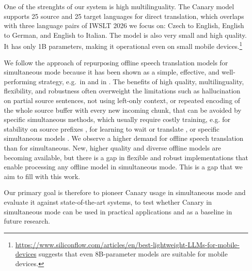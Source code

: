 \documentclass[11pt]{article}
\begin{document}
One of the strenghts of our system is high multilinguality. The Canary model supports 25 source and 25 target languages for direct translation, which overlaps with three language pairs of IWSLT 2026 we focus on: Czech to English, English to German, and English to Italian. The model is also very small and high quality. It has only 1B parameters, making it operational even on small mobile devices.\footnote{\url{https://www.siliconflow.com/articles/en/best-lightweight-LLMs-for-mobile-devices} suggests that even 8B-parameter models are suitable for mobile devices.}


We follow the approach of repurposing offline speech translation models for simultaneous mode because it has been shown as a simple, effective, and well-performing strategy, e.g.\ in \citet{papi-etal-2022-simultaneous} and in \citet{machacek-polak-2025-simultaneous}. The benefits of high quality, multilinguality, flexibility, and robustness often overweight the limitations such as hallucination on partial source sentences, not using left-only context, or repeated encoding of the whole source buffer with every new incoming chunk, that can be avoided by specific simultaneous methods, which usually require costly training, e.g. for stability on source prefixes \cite{niehues18_interspeech}, for learning to wait or translate \cite{Koshkin2026StreamingTA}, or  specific simultaneous models \cite{arivazhagan-etal-2019-monotonic,kyutai2025hibiki}.
We observe a higher demand for offline speech translation than for simultaneous. New, higher quality and diverse offline models are becoming available, but there is a gap in flexible and robust implementations that enable processing any offline model in simultaneous mode. This is a gap that we aim to fill with this work. 

Our primary goal is therefore to pioneer Canary usage in simultaneous mode and evaluate it against state-of-the-art systems, to test whether Canary in simultaneous mode can be used in practical applications and as a baseline in future research.
\end{document}
